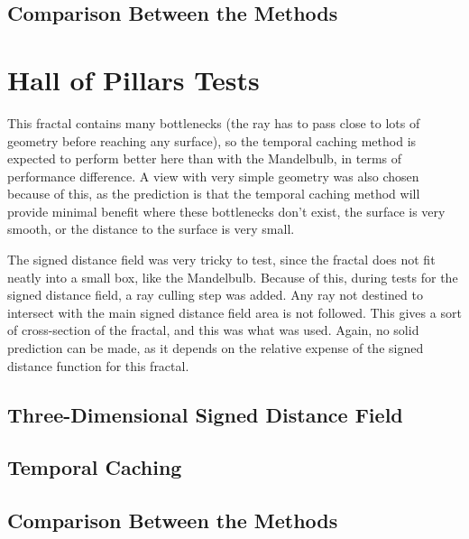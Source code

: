 \subsection{Comparison Between the Methods}

\section{Hall of Pillars Tests}

This fractal contains many bottlenecks (the ray has to pass close to lots of geometry before reaching any surface), so the temporal caching method is expected to perform better here than with the Mandelbulb, in terms of performance difference. A view with very simple geometry was also chosen because of this, as the prediction is that the temporal caching method will provide minimal benefit where these bottlenecks don't exist, the surface is very smooth, or the distance to the surface is very small.\newline

The signed distance field was very tricky to test, since the fractal does not fit neatly into a small box, like the Mandelbulb. Because of this, during tests for the signed distance field, a ray culling step was added. Any ray not destined to intersect with the main signed distance field area is not followed. This gives a sort of cross-section of the fractal, and this was what was used. Again, no solid prediction can be made, as it depends on the relative expense of the signed distance function for this fractal.

\subsection{Three-Dimensional Signed Distance Field}

\subsection{Temporal Caching}

\subsection{Comparison Between the Methods}